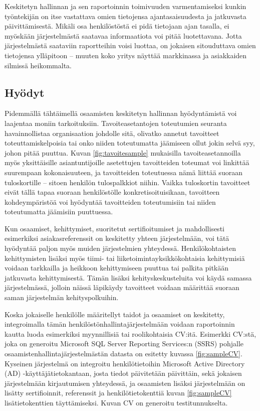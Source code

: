 \documentclass[a4paper,finnish,12pt]{article}
\begin{document}
Keskitetyn hallinnan ja sen raportoinnin toimivuuden varmentamiseksi kunkin työntekijän on itse vastattava omien tietojensa ajantasaisuudesta ja jatkuvasta päivittämisestä. Mikäli osa henkilöstöstä ei pidä tietojaan ajan tasalla, ei myöskään järjestelmästä saatavaa informaatiota voi pitää luotettavana. Jotta järjestelmästä saataviin raportteihin voisi luottaa, on jokaisen sitouduttava omien tietojensa ylläpitoon -- muuten koko yritys näyttää markkinassa ja asiakkaiden silmissä heikommalta.

\subsection{Hyödyt}

Pidemmällä tähtäimellä osaamisten keskitetyn hallinnan hyödyntämistä voi laajentaa moniin tarkoituksiin. Tavoiteasetantojen toteutumien seuranta havainnollistaa organisaation johdolle sitä, olivatko annetut tavoitteet toteuttamiskelpoisia tai onko niiden toteutumatta jäämiseen ollut jokin selvä syy, johon pitää puuttua. Kuvan \ref{fig:tavoitesample} mukaisilla tavoiteasetannoilla myös yksittäisille asiantuntijoille asetettujen tavoitteiden toteumat voi linkittää suurempaan kokonaisuuteen, ja tavoitteiden toteutuessa nämä liittää suoraan tuloskortille -- sitoen henkilön tulospalkkiot niihin. Vaikka tuloskortin tavoitteet eivät tällä tapaa suoraan henkilöstölle konkretisoituisikaan, tavoitteen kohdeympäristöä voi hyödyntää tavoitteiden toteutumisiin tai niiden toteutumatta jäämisiin puuttuessa.

Kun osaamiset, kehittymiset, suoritetut sertifioitumiset ja mahdollisesti esimerkiksi asiakasreferenssit on keskitetty yhteen järjestelmään, voi tätä hyödyntää paljon myös muiden järjestelmien yhteydessä. Henkilökohtaisten kehittymisten lisäksi myös tiimi- tai liiketoimintayksikkökohtaisia kehittymisiä voidaan tarkkailla ja heikkoon kehittymiseen puuttua tai palkita pitkään jatkuvasta kehittymisestä. Tämän lisäksi kehityskeskusteluita voi käydä samassa järjestelmässä, jolloin näissä läpikäydy tavoitteet voidaan määrittää suoraan saman järjestelmän kehityspolkuihin.

Koska jokaiselle henkilölle määritellyt taidot ja osaamiset on keskitetty, integroimalla tämän henkilöstönhallintajärjestelmään voidaan raportoinnin kautta luoda esimerkiksi myynnillisiä tai roolikohtaisia CV:itä. Esimerkki CV:stä, joka on generoitu Microsoft SQL Server Reporting Services:n (SSRS) pohjalle osaamistenhallintajärjestelmästän datasta on esitetty kuvassa \ref{fig:sampleCV}. Kyseinen järjestelmä on integroitu henkilötietoihin Microsoft Active Directory (AD) -käyttäjätietokantaan, josta tiedot päivitetään päivittäin, sekä jokaisen järjestelmään kirjautumisen yhteydessä, ja osaamisten lisäksi järjestelmään on lisätty sertifioinnit, referenssit ja henkilötietokenttiä kuvan \ref{fig:sampleCV} lisätietokenttien täyttämiseksi. Kuvan CV on generoitu testitunnukselta.
\end{document}
